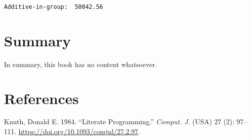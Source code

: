 \documentclass[
  letterpaper,
  DIV=11,
  numbers=noendperiod]{scrreprt}
\newlength{\cslhangindent}
\newenvironment{CSLReferences}[2] %
 {\begin{list}{}{%
  \setlength{\itemindent}{0pt}
  \setlength{\leftmargin}{0pt}
  \setlength{\parsep}{0pt}
  \ifodd #1
   \setlength{\leftmargin}{\cslhangindent}
   \setlength{\itemindent}{-1\cslhangindent}
  \fi
  \setlength{\itemsep}{#2\baselineskip}}}
 {\end{list}}
\begin{document}
{\begin{verbatim}
Additive-in-group:  50042.56 
\end{verbatim}


\chapter{Summary}\label{summary}

In summary, this book has no content whatsoever.


\chapter*{References}\label{references}


\protect{}\label{refs}
\begin{CSLReferences}{1}{1}
Knuth, Donald E. 1984. {``Literate Programming.''} \emph{Comput. J.}
(USA) 27 (2): 97--111. \url{https://doi.org/10.1093/comjnl/27.2.97}.

\end{CSLReferences}
\end{document}
